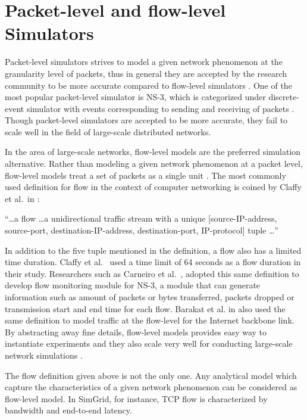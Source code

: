 \section{Packet-level and flow-level Simulators}
\label{section:packetflow} 
Packet-level simulators strives to model a given network phenomenon at the granularity level of packets, thus in general they are accepted by the research community to be more accurate compared to flow-level simulators \cite{DBLP:journals/jpdc/CasanovaGLQS14}. One of the most popular packet-level simulator is NS-3, which is categorized under discrete-event simulator with events corresponding to sending and receiving of packets \cite{ns3}. Though packet-level simulators are accepted to be more accurate, they fail to scale well in the field of large-scale distributed networks. 

In the area of large-scale networks, flow-level models are the preferred simulation alternative. Rather than modeling a given network phenomenon at a packet level, flow-level models treat a set of packets as a single unit \cite{DBLP:journals/jpdc/CasanovaGLQS14}. The most commonly used definition for flow in the context of computer networking is coined by Claffy et al.{\ }in \cite{claffy1998nature}: 

``\ldots a flow \ldots a unidirectional traffic stream with a unique [source-IP-address, source-port, destination-IP-address, destination-port, IP-protocol] tuple \ldots''

In addition to the five tuple mentioned in the definition, a flow also has a limited time duration. Claffy et al.{\ }\cite{claffy1998nature} used a time limit of 64 seconds as a flow duration in their study. Researchers such as Carneiro et al.{\ }\cite{DBLP:conf/valuetools/CarneiroFR09}, adopted this same definition to develop flow monitoring module for NS-3, a module that can generate information such as amount of packets or bytes transferred, packets dropped or transmission start and end time for each flow. Barakat et al. in \cite{DBLP:journals/tsp/BarakatTIDO03} also used the same definition to model traffic at the flow-level for the Internet backbone link. By abstracting away fine details, flow-level models provides easy way to instantiate experiments and they also scale very well for conducting large-scale network simulations \cite{DBLP:journals/jpdc/CasanovaGLQS14,DBLP:journals/tsp/BarakatTIDO03}.

The flow definition given above is not the only one. Any analytical model which capture the characteristics of a given network phenomenon can be considered as flow-level model. In SimGrid, for instance, TCP flow is characterized by bandwidth and end-to-end latency\cite{DBLP:journals/jpdc/CasanovaGLQS14}.

